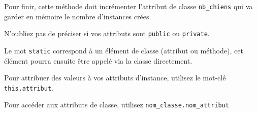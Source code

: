 \begin{Exercice}[10 minutes]
   	Pour finir, cette méthode doit incrémenter l'attribut de classe \lstinline{nb_chiens} qui va garder en mémoire le nombre d'instances crées.
   	
\begin{conseil}
   N'oubliez pas de préciser si vos attributs sont \lstinline{public} ou \lstinline{private}.
   
   Le mot \lstinline{static} correspond à un élément de classe (attribut ou méthode), cet élément pourra ensuite être appelé via la classe directement.
   
   Pour attribuer des valeurs à vos attributs d'instance, utilisez le mot-clé \lstinline{this.attribut}.
   
   Pour accéder aux attributs de classe, utilisez \lstinline{nom_classe.nom_attribut}
\end{conseil}
    
\begin{solution}
	
\end{solution}
\end{Exercice}

